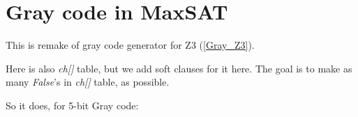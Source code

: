 \section{Gray code in MaxSAT}
\label{Gray_MaxSAT}

\renewcommand{\CURPATH}{gray_code/MaxSAT}

This is remake of gray code generator for Z3 (\ref{Gray_Z3}).

Here is also \textit{ch[]} table, but we add soft clauses for it here.
The goal is to make as many \textit{False}'s in \textit{ch[]} table, as possible.



So it does, for 5-bit Gray code:



